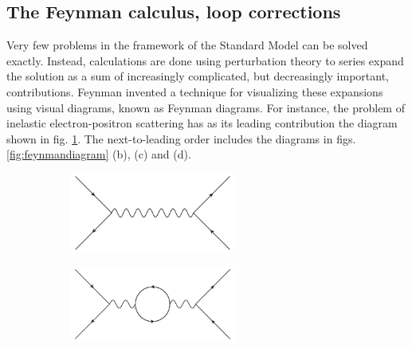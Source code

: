 \documentclass[twoside,english]{uiofysmaster}
\begin{document}
\subsection{The Feynman calculus, loop corrections}
\label{subsec:feynmancalculus}
Very few problems in the framework of the Standard Model can be solved exactly. Instead, calculations are done using perturbation theory to series expand the solution as a sum of increasingly complicated, but decreasingly important, contributions. Feynman invented a technique for visualizing these expansions using visual diagrams, known as Feynman diagrams. For instance, the problem of inelastic electron-positron scattering has as its leading contribution the diagram shown in fig. \ref{fig:feynmandiagram_a}. The next-to-leading order includes the diagrams in figs. \ref{fig:feynmandiagram} (b), (c) and (d).
\begin{figure}[htbp]
	\centering
	\begin{subfigure}[b]{0.45\textwidth}
		\centering
		\includegraphics[width=0.6\textwidth]{figures/susyintro/epscattering.pdf}
		\caption{ }
		\label{fig:feynmandiagram_a}
	\end{subfigure}
	\begin{subfigure}[b]{0.45\textwidth}
		\centering
		\includegraphics[width=0.6\textwidth]{figures/susyintro/epscattering_fermionloop.pdf}
		\caption{ }
		\label{fig:feynmandiagram_b}
	\end{subfigure}


\end{figure}
\end{document}
